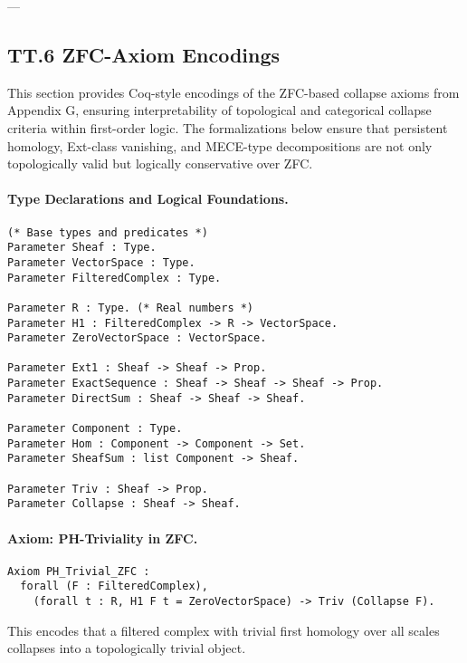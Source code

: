 \documentclass[11pt]{article}
\begin{document}
{---

\subsection*{TT.6 ZFC-Axiom Encodings}

This section provides Coq-style encodings of the ZFC-based collapse axioms from Appendix G,  
ensuring interpretability of topological and categorical collapse criteria within first-order logic.  
The formalizations below ensure that persistent homology, Ext-class vanishing, and MECE-type decompositions  
are not only topologically valid but logically conservative over ZFC.

\paragraph{Type Declarations and Logical Foundations.}

\begin{lstlisting}[language=Coq]
(* Base types and predicates *)
Parameter Sheaf : Type.
Parameter VectorSpace : Type.
Parameter FilteredComplex : Type.

Parameter R : Type. (* Real numbers *)
Parameter H1 : FilteredComplex -> R -> VectorSpace.
Parameter ZeroVectorSpace : VectorSpace.

Parameter Ext1 : Sheaf -> Sheaf -> Prop.
Parameter ExactSequence : Sheaf -> Sheaf -> Sheaf -> Prop.
Parameter DirectSum : Sheaf -> Sheaf -> Sheaf.

Parameter Component : Type.
Parameter Hom : Component -> Component -> Set.
Parameter SheafSum : list Component -> Sheaf.

Parameter Triv : Sheaf -> Prop.
Parameter Collapse : Sheaf -> Sheaf.
\end{lstlisting}

\paragraph{Axiom: PH-Triviality in ZFC.}

\begin{lstlisting}[language=Coq]
Axiom PH_Trivial_ZFC :
  forall (F : FilteredComplex),
    (forall t : R, H1 F t = ZeroVectorSpace) -> Triv (Collapse F).
\end{lstlisting}

This encodes that a filtered complex with trivial first homology over all scales  
collapses into a topologically trivial object.

}
\end{document}
